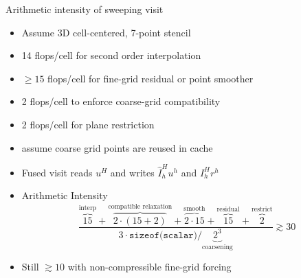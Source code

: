\documentclass{beamer}
\begin{document}
\begin{frame}{Arithmetic intensity of sweeping visit}
  \begin{itemize}
  \item Assume 3D cell-centered, 7-point stencil
  \item 14 flops/cell for second order interpolation
  \item $\ge 15$ flops/cell for fine-grid residual or point smoother
  \item 2 flops/cell to enforce coarse-grid compatibility
  \item 2 flops/cell for plane restriction
  \item assume coarse grid points are reused in cache
  \item Fused visit reads $u^H$ and writes $\hat I_h^H u^h$ and $I_h^H r^h$
  \item Arithmetic Intensity
    \begin{equation}
      \frac{{\overbrace{15}^{\text{interp}}} + {\overbrace{2\cdot (15+2)}^{\text{compatible relaxation}}} + \overbrace{2\cdot 15}^{\text{smooth}} + \overbrace{15}^{\text{residual}} + \overbrace{2}^{\text{restrict}}}{3 \cdot \texttt{sizeof(scalar)} / \underbrace{2^3}_{\text{coarsening}}} \gtrsim 30
    \end{equation}
  \item Still $\gtrsim 10$ with non-compressible fine-grid forcing
  \end{itemize}
\end{frame}
\end{document}
